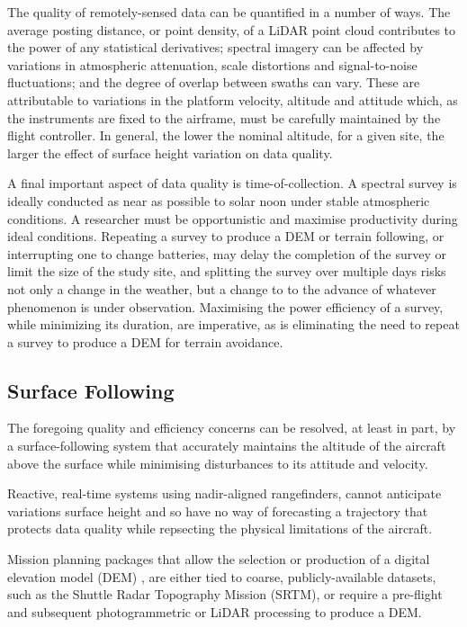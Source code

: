 \documentclass[doc]{apa6}
\begin{document}
The quality of remotely-sensed data can be quantified in a number of ways. The average posting distance, or point density, of a LiDAR point cloud contributes to the power of any statistical derivatives; spectral imagery can be affected by variations in atmospheric attenuation, scale distortions and signal-to-noise fluctuations; and the degree of overlap between swaths can vary. These are attributable to variations in the platform velocity, altitude and attitude which, as the instruments are fixed to the airframe, must be carefully maintained by the flight controller. In general, the lower the nominal altitude, for a given site, the larger the effect of surface height variation on data quality.

A final important aspect of data quality is time-of-collection. A spectral survey is ideally conducted as near as possible to solar noon under stable atmospheric conditions. A researcher must be opportunistic and maximise productivity during ideal conditions. Repeating a survey to produce a DEM or terrain following, or interrupting one to change batteries, may delay the completion of the survey or limit the size of the study site, and splitting the survey over multiple days risks not only a change in the weather, but a change to to the advance of whatever phenomenon is under observation. Maximising the power efficiency of a survey, while minimizing its duration, are imperative, as is eliminating the need to repeat a survey to produce a DEM for terrain avoidance.


\subsection{Surface Following}

The foregoing quality and efficiency concerns can be resolved, at least in part, by a surface-following system that accurately maintains the altitude of the aircraft above the surface while minimising disturbances to its attitude and velocity. 

Reactive, real-time systems using nadir-aligned rangefinders, cannot anticipate variations surface height and so have no way of forecasting a trajectory that protects data quality while repsecting the physical limitations of the aircraft.

Mission planning packages that allow the selection or production of a digital elevation model (DEM) \parencite[e.g.,][]{PrecisionHawk2018,UgCS2018,MapsMadeEasy2018}, are either tied to coarse, publicly-available datasets, such as the Shuttle Radar Topography Mission (SRTM), or require a pre-flight and subsequent photogrammetric or LiDAR processing to produce a DEM. 
\end{document}
